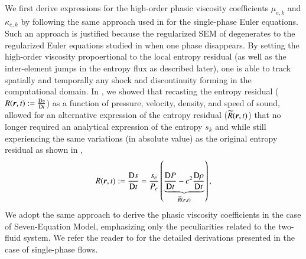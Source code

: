 \documentclass[preprint,10pt]{elsarticle}
\begin{document}
We first derive expressions for the high-order phasic viscosity coefficients $\mu_{e,k}$ and $\kappa_{e,k}$ by following the same 
approach used in \cite{DelchiniCompFluid2014-euler} for the single-phase Euler equations. Such an approach is justified because the regularized SEM of  
degenerates to the regularized Euler equations studied in \cite{DelchiniCompFluid2014-euler} when one phase disappears.
By setting the high-order viscosity propoertional to the local entropy residual (as well as the inter-element jumps in the entropy flux as described later),
one is able to track spatially and temporally any shock and discontinuity forming in the computational domain. 
In \cite{DelchiniCompFluid2014-euler}, we showed that recasting the entropy residual ($R(\boldsymbol r,t)  := \frac{\textrm{D} s}{\textrm{D} t}$) 
as a function of pressure, velocity, density, and speed of 
sound, allowed for an alternative expression of the entropy residual ($\widetilde{R}(\boldsymbol r,t)$)
that no longer required an analytical expression of the entropy $s_k$ and while still experiencing the same variations (in absolute value) 
as the original entropy residual as shown in ,
%
\begin{equation}\label{eq:ent-res-sem}
R(\boldsymbol r,t)  := \frac{\textrm{D} s}{\textrm{D} t} = \frac{s_e}{P_e} \left( \underbrace{\frac{\textrm{D} P}{\textrm{D} t} - c^2 \frac{\textrm{D} \rho}{\textrm{D} t} }_{\widetilde{R}(\boldsymbol r,t)} \right) ,
\end{equation} 
%
We adopt the same approach to derive the phasic viscosity coefficients in the case of Seven-Equation Model, emphasizing only the 
peculiarities related to the two-fluid system. We refer the reader to \cite{DelchiniCompFluid2014-euler} for the detailed derivations presented in the case of
single-phase flows.
\end{document}
